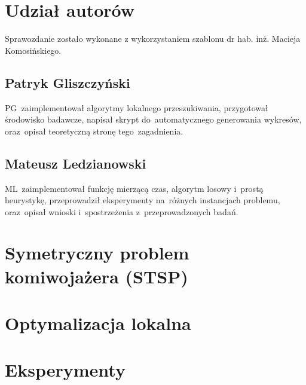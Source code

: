 \documentclass{article}
\begin{document}
\sloppy
{}



\section*{Udział autorów}

Sprawozdanie zostało wykonane z wykorzystaniem szablonu dr hab. inż. Macieja Komosińskiego. \cite{MiOIB}

\subsection*{Patryk Gliszczyński}
PG~zaimplementował algorytmy lokalnego przeszukiwania, przygotował środowisko badawcze, napisał skrypt do~automatycznego generowania wykresów, oraz~opisał teoretyczną stronę tego~zagadnienia.

\subsection*{Mateusz Ledzianowski}
ML~zaimplementował funkcję mierzącą czas, algorytm losowy i~prostą heurystykę, przeprowadził eksperymenty na~różnych instancjach problemu, oraz~opisał wnioski i~spostrzeżenia z~przeprowadzonych badań.

\clearpage

\section{Symetryczny problem komiwojażera (STSP)}


\clearpage

\section{Optymalizacja lokalna}


\clearpage

\section{Eksperymenty}
\end{document}
